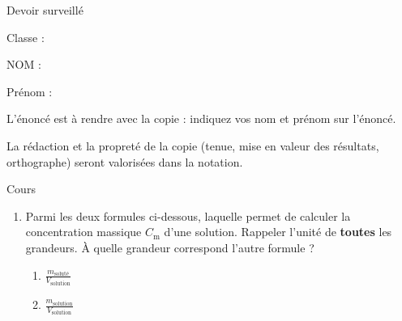 \documentclass[12pt,a4paper]{article}
\begin{document}
\begin{header}
Devoir surveillé
\normalsize
\flushleft
\begin{doublespace}
Classe :

NOM :

\end{doublespace}
Prénom :
\end{header}
L'énoncé est à rendre avec la copie : indiquez vos nom et prénom sur l'énoncé.

\noindent
La rédaction et la propreté de la copie (tenue, mise en valeur des résultats, orthographe) seront valorisées dans la notation.

\noindent
\com{} 

\begin{exo}{Cours}

\begin{enumerate}
\item \rco{} 

Parmi les deux formules ci-dessous, laquelle permet de calculer la concentration massique $C_\mathrm{m}$ d'une solution.
Rappeler l'unité de \textbf{toutes} les grandeurs.
À quelle grandeur correspond l'autre formule ?
\begin{multicols}{3}
\begin{enumerate}
\item $\frac{m_\mathrm{soluté}}{V_\mathrm{solution}}$

\item $\frac{m_\mathrm{solution}}{V_\mathrm{solution}}$
\end{enumerate}
\end{multicols}



\end{enumerate}
\end{exo}
\end{document}
